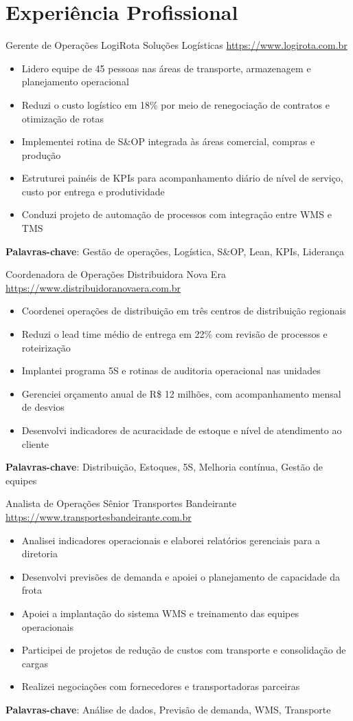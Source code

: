 \documentclass[a4paper, serif, 10pt]{moderncv}
\begin{document}
\section{Experiência Profissional}

        {Gerente de Operações}
        {LogiRota Soluções Logísticas}
        {\url{https://www.logirota.com.br}}
        {}
        {\begin{itemize}
\item Lidero equipe de 45 pessoas nas áreas de transporte, armazenagem e planejamento operacional
\item Reduzi o custo logístico em 18\% por meio de renegociação de contratos e otimização de rotas
\item Implementei rotina de S\&OP integrada às áreas comercial, compras e produção
\item Estruturei painéis de KPIs para acompanhamento diário de nível de serviço, custo por entrega e produtividade
\item Conduzi projeto de automação de processos com integração entre WMS e TMS
\end{itemize}
\textbf{Palavras-chave}: Gestão de operações, Logística, S\&OP, Lean, KPIs, Liderança}

        {Coordenadora de Operações}
        {Distribuidora Nova Era}
        {\url{https://www.distribuidoranovaera.com.br}}
        {}
        {\begin{itemize}
\item Coordenei operações de distribuição em três centros de distribuição regionais
\item Reduzi o lead time médio de entrega em 22\% com revisão de processos e roteirização
\item Implantei programa 5S e rotinas de auditoria operacional nas unidades
\item Gerenciei orçamento anual de R\$ 12 milhões, com acompanhamento mensal de desvios
\item Desenvolvi indicadores de acuracidade de estoque e nível de atendimento ao cliente
\end{itemize}
\textbf{Palavras-chave}: Distribuição, Estoques, 5S, Melhoria contínua, Gestão de equipes}

        {Analista de Operações Sênior}
        {Transportes Bandeirante}
        {\url{https://www.transportesbandeirante.com.br}}
        {}
        {\begin{itemize}
\item Analisei indicadores operacionais e elaborei relatórios gerenciais para a diretoria
\item Desenvolvi previsões de demanda e apoiei o planejamento de capacidade da frota
\item Apoiei a implantação do sistema WMS e treinamento das equipes operacionais
\item Participei de projetos de redução de custos com transporte e consolidação de cargas
\item Realizei negociações com fornecedores e transportadoras parceiras
\end{itemize}
\textbf{Palavras-chave}: Análise de dados, Previsão de demanda, WMS, Transporte}
\end{document}
